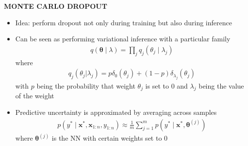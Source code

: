 \begin{whitebox}{\textbf{MONTE CARLO DROPOUT}}
    \begin{center}
    \end{center}
    \begin{itemize}
        \item Idea: perform dropout not only during training but also during inference
        \item Can be seen as performing variational inference with a particular family
        \begin{align*}
            q(\bm{\theta}\mid\lambda)=\prod_jq_j(\theta_j\mid\lambda_j)
        \end{align*}
        where
        \begin{align*}
            q_j(\theta_j|\lambda_j)=p\delta_0(\theta_j)+(1-p)\delta_{\lambda_j}(\theta_j)
        \end{align*}
        with $p$ being the probability that weight $\theta_j$ is set to $0$ and $\lambda_j$ being the value of the weight
        \item Predictive uncertainty is approximated by averaging across samples
        \begin{align*}
            p(y^*\mid\bm{x}^*,\bm{x}_{1:n},y_{1:n})\approx\frac{1}{m}\sum_{j=1}^mp(y^*\mid\bm{x}^*,\bm{\theta}^{(j)})
        \end{align*}
        where $\bm{\theta}^{(j)}$ is the NN with certain weights set to $0$
    \end{itemize}
\end{whitebox}


